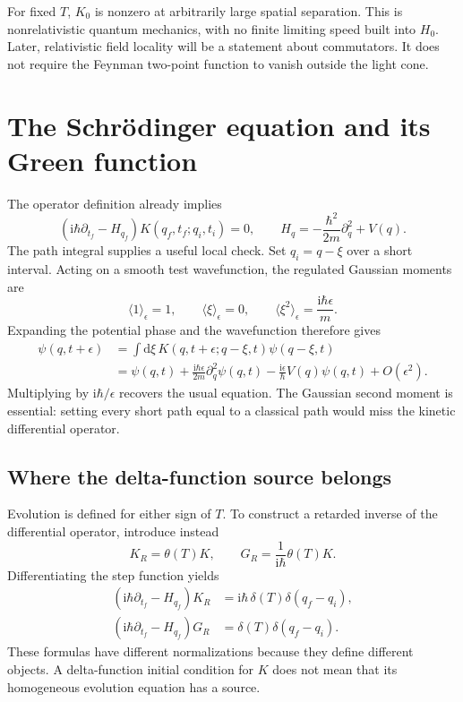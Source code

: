 \documentclass[11pt]{article}
\newcommand{\dd}{\mathrm d}
\newcommand{\ii}{\mathrm i}
\newcommand{\module}[1]{\clearpage\section{#1}}
\begin{document}
For fixed \(T\), \(K_0\) is nonzero at arbitrarily large spatial
separation. This is nonrelativistic quantum mechanics, with no finite
limiting speed built into \(H_0\). Later, relativistic field locality
will be a statement about commutators. It does not require the Feynman
two-point function to vanish outside the light cone.

\module{The Schr\"odinger equation and its Green function}
The operator definition already implies
\begin{equation}
 (\ii\hbar\partial_{t_f}-H_{q_f})K(q_f,t_f;q_i,t_i)=0,
 \qquad H_q=-\frac{\hbar^2}{2m}\partial_q^2+V(q).       \label{eq:schrod}
\end{equation}
The path integral supplies a useful local check. Set
\(q_i=q-\xi\) over a short interval. Acting on a smooth test
wavefunction, the regulated Gaussian moments are
\begin{equation}
 \langle1\rangle_\epsilon=1,\qquad
 \langle\xi\rangle_\epsilon=0,\qquad
 \langle\xi^2\rangle_\epsilon=\frac{\ii\hbar\epsilon}{m}.
\end{equation}
Expanding the potential phase and the wavefunction therefore gives
\begin{align}
 \psi(q,t+\epsilon)
 &=\int\dd\xi\,K(q,t+\epsilon;q-\xi,t)\psi(q-\xi,t)\\
 &=\psi(q,t)+\frac{\ii\hbar\epsilon}{2m}\partial_q^2\psi(q,t)
   -\frac{\ii\epsilon}{\hbar}V(q)\psi(q,t)+O(\epsilon^2).
\end{align}
Multiplying by \(\ii\hbar/\epsilon\) recovers the usual equation.
The Gaussian second moment is essential: setting every short path equal
to a classical path would miss the kinetic differential operator.

\subsection{Where the delta-function source belongs}
Evolution is defined for either sign of \(T\). To construct a retarded
inverse of the differential operator, introduce instead
\begin{equation}
 K_R=\theta(T)K,\qquad G_R=\frac{1}{\ii\hbar}\theta(T)K.
\end{equation}
Differentiating the step function yields
\begin{align}
 (\ii\hbar\partial_{t_f}-H_{q_f})K_R
 &=\ii\hbar\,\delta(T)\delta(q_f-q_i),\\
 (\ii\hbar\partial_{t_f}-H_{q_f})G_R
 &=\delta(T)\delta(q_f-q_i).                          \label{eq:green}
\end{align}
These formulas have different normalizations because they define
different objects. A delta-function initial condition for \(K\) does
not mean that its homogeneous evolution equation has a source.
\end{document}
